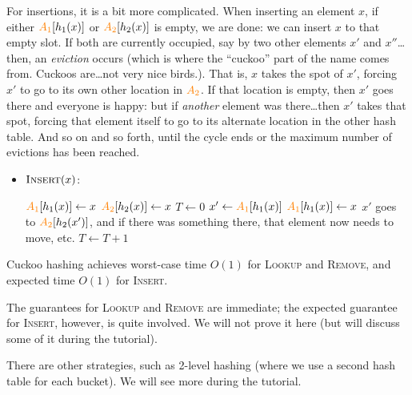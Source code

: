 \begin{itemize}
    For insertions, it is a bit more complicated. When inserting an element $x$, if either $\textcolor{orange}{A_1}[h_1(x)]$ or $\textcolor{orange}{A_2}[h_2(x)]$ is empty, we are done: we can insert $x$ to that empty slot. If both are currently occupied, say by two other elements $x'$ and $x''$\dots then, an \emph{eviction} occurs (which is where the ``cuckoo'' part of the name comes from. Cuckoos are\dots not very nice birds.). That is, $x$ takes the spot of $x'$, forcing $x'$ to go to its own other location in $\textcolor{orange}{A_2}$. If that location is empty, then $x'$ goes there and everyone is happy: but if \emph{another} element was there\dots then $x'$ takes that spot, forcing that element itself to go to its alternate location in the other hash table. And so on and so forth, until the cycle ends or the maximum number of evictions has been reached.
    \begin{itemize}
        \item$\textsc{Insert}(x)$: 
                    \begin{algorithmic}
                        \State $\textcolor{orange}{A_1}[h_1(x)] \gets x$
                        \State $\textcolor{orange}{A_2}[h_2(x)] \gets x$
                \Else
                    \State $T \gets 0$ 
                    \State $x' \gets \textcolor{orange}{A_1}[h_1(x)]$
                    \State $\textcolor{orange}{A_1}[h_1(x)] \gets x$
                    \State $x'$ goes to $\textcolor{orange}{A_2}[h_2(x')]$, and if there was something there, that element now needs to move, etc.
                    \State $T\gets T+1$
                    \EndWhile                    
                \EndIf
            \end{algorithmic}
    \end{itemize}
    \begin{theorem}
        Cuckoo hashing achieves worst-case time $O(1)$ for \textsc{Lookup} and
\textsc{Remove}, and expected time $O(1)$ for \textsc{Insert}.
    \end{theorem}
    The guarantees for \textsc{Lookup} and \textsc{Remove} are immediate; the expected guarantee for \textsc{Insert}, however, is quite involved. We will not prove it here (but will discuss some of it during the tutorial).
\end{itemize}

\begin{remark}
There are other strategies, such as 2-level hashing (where we use a second hash table for each bucket). We will see more during the tutorial.
\end{remark}
